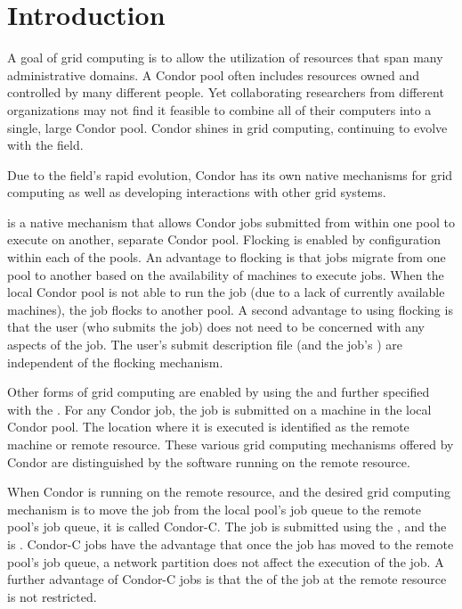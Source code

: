 \section{\label{sec:grids-intro}Introduction}

A goal of grid computing is to allow the utilization of resources that
span many administrative domains.
A Condor pool often includes
resources owned and controlled by many different people.
Yet collaborating researchers from different organizations
may not find it feasible to combine all of their computers
into a single, large Condor pool.
Condor shines in grid computing,
continuing to evolve with the field.

Due to the field's rapid evolution, Condor has its own native mechanisms
for grid computing as well as developing interactions 
with other grid systems.


 is a native mechanism that allows Condor jobs
submitted from within one pool
to execute on another, separate Condor pool.
Flocking is enabled by configuration within each of the pools.
An advantage to flocking is that jobs migrate from one
pool to another based on the availability of machines to
execute jobs.
When the local Condor pool is not able to run the job
(due to a lack of currently available machines),
the job flocks to another pool.
A second advantage to using flocking is that the user
(who submits the job) does not need to be concerned with
any aspects of the job.
The user's submit description file (and the job's )
are independent of the flocking mechanism.

Other forms of grid computing are enabled by using
the  
and further specified with the .
For any Condor job, 
the job is submitted on a machine in the local Condor pool.
The location where it is executed is identified as the remote machine
or remote resource.
These various grid computing mechanisms offered by
Condor are distinguished by the software
running on the remote resource.

When Condor is running on the remote resource,
and the desired grid computing mechanism 
is to move the job from the local pool's job queue
to the remote pool's job queue,
it is called Condor-C.
The job is submitted using the 
, 
and the  is .
Condor-C jobs have the advantage that once the job has moved
to the remote pool's job queue,
a network partition does not affect the execution of the job.
A further advantage of Condor-C jobs is that the 
of the job at the remote resource is not restricted. 

